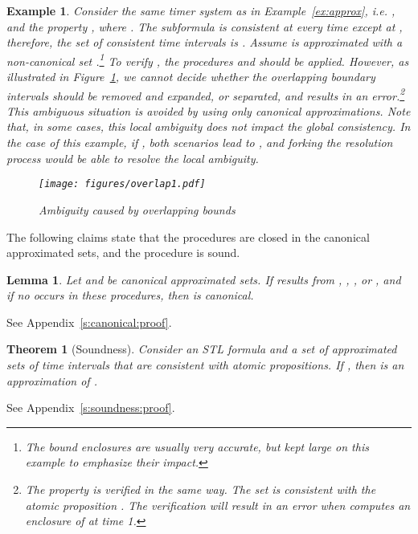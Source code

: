 \documentclass[paper]{ieice}
\newtheorem{theorem}{Theorem}
\newtheorem{lemma}{Lemma}
\newtheorem{example}{Example}
\newenvironment{proof}[1][Proof.]{\begin{trivlist}
\item[\hskip \labelsep {\itshape #1}]}{\end{trivlist}}
\begin{document}
\begin{example}
Consider the same timer system as in Example~\ref{ex:approx}, i.e. ,
and the property 
, where .
The subformula  is consistent at every time except at , therefore, the set of consistent time intervals is .
Assume  is approximated with a non-canonical set .\footnote{The bound enclosures are usually very accurate, but kept large on this example to emphasize their impact.}
To verify , the procedures  and  should be applied.
However, as illustrated in Figure~\ref{f:overlap}, we cannot decide whether the overlapping boundary intervals should be removed and expanded, or separated, and  results in an error.\footnote{The property  is verified in the same way. The set  is consistent with the atomic proposition . The verification will result in an error when  computes an enclosure of  at time 1.} This ambiguous situation is avoided by using only canonical approximations. Note that, in some cases, this local ambiguity does not impact the global consistency. In the case of this example, if , both scenarios lead to , and forking the resolution process would be able to resolve the local ambiguity.

\begin{figure}[ht]
	\vspace{-1em}
\centering
\texttt{[image: figures/overlap1.pdf]}
\caption{Ambiguity caused by overlapping bounds}
\label{f:overlap}
\end{figure}
\end{example}

The following claims state that the procedures are closed in the canonical approximated sets, and the  procedure is sound.

\begin{lemma} \label{th:canonical}
	Let  and  be canonical approximated sets.
	If  results from , , , or , and if no  occurs in these procedures, then  is canonical.
\end{lemma}
\begin{proof}
	See Appendix~\ref{s:canonical:proof}.
\end{proof}

\begin{theorem}[Soundness] \label{th:soundness}
	Consider an STL formula  and a set  of approximated sets of time intervals that are consistent with atomic propositions.
	If ,
	then  is an approximation of .
\end{theorem}
\begin{proof}
	See Appendix~\ref{s:soundness:proof}.
\end{proof}
\end{document}

